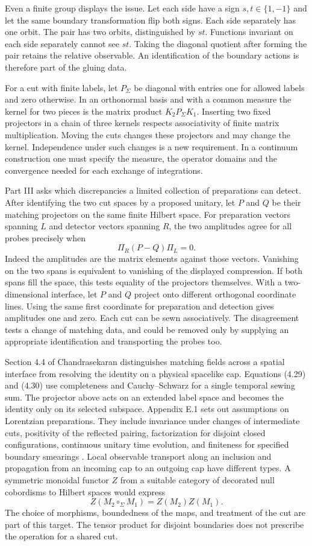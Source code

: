 \documentclass[11pt,letterpaper]{article}
\begin{document}
Even a finite group displays the issue. Let each side have a sign $s,t\in\{1,-1\}$ and let the same boundary transformation flip both signs. Each side separately has one orbit. The pair has two orbits, distinguished by $st$. Functions invariant on each side separately cannot see $st$. Taking the diagonal quotient after forming the pair retains the relative observable. An identification of the boundary actions is therefore part of the gluing data.

For a cut with finite labels, let $P_{\Sigma}$ be diagonal with entries one for allowed labels and zero otherwise. In an orthonormal basis and with a common measure the kernel for two pieces is the matrix product $K_2P_{\Sigma}K_1$. Inserting two fixed projectors in a chain of three kernels respects associativity of finite matrix multiplication. Moving the cuts changes these projectors and may change the kernel. Independence under such changes is a new requirement. In a continuum construction one must specify the measure, the operator domains and the convergence needed for each exchange of integrations.

Part III asks which discrepancies a limited collection of preparations can detect. After identifying the two cut spaces by a proposed unitary, let $P$ and $Q$ be their matching projectors on the same finite Hilbert space. For preparation vectors spanning $L$ and detector vectors spanning $R$, the two amplitudes agree for all probes precisely when
\[
                \Pi_R(P-Q)\Pi_L=0 .
\]
Indeed the amplitudes are the matrix elements against those vectors. Vanishing on the two spans is equivalent to vanishing of the displayed compression. If both spans fill the space, this tests equality of the projectors themselves. With a two-dimensional interface, let $P$ and $Q$ project onto different orthogonal coordinate lines. Using the same first coordinate for preparation and detection gives amplitudes one and zero. Each cut can be sewn associatively. The disagreement tests a change of matching data, and could be removed only by supplying an appropriate identification and transporting the probes too.

Section 4.4 of Chandrasekaran distinguishes matching fields across a spatial interface from resolving the identity on a physical spacelike cap. Equations (4.29) and (4.30) use completeness and Cauchy--Schwarz for a single temporal sewing sum. The projector above acts on an extended label space and becomes the identity only on its selected subspace. Appendix E.1 sets out assumptions on Lorentzian preparations. They include invariance under changes of intermediate cuts, positivity of the reflected pairing, factorization for disjoint closed configurations, continuous unitary time evolution, and finiteness for specified boundary smearings \cite{nc}. Local observable transport along an inclusion and propagation from an incoming cap to an outgoing cap have different types. A symmetric monoidal functor $Z$ from a suitable category of decorated null cobordisms to Hilbert spaces would express
\[
 Z(M_2\circ_{\Sigma}M_1)=Z(M_2)Z(M_1).
\]
The choice of morphisms, boundedness of the maps, and treatment of the cut are part of this target. The tensor product for disjoint boundaries does not prescribe the operation for a shared cut.
\end{document}
